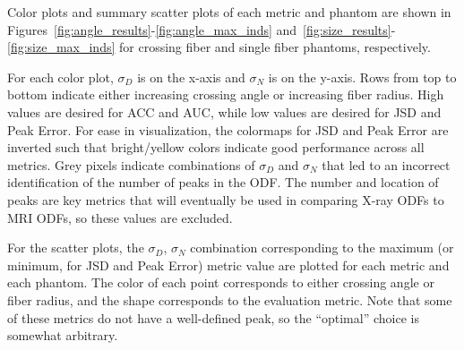 \documentclass[11pt]{article}
\begin{document}
Color plots and summary scatter plots of each metric and phantom are shown in
Figures~\ref{fig:angle_results}-\ref{fig:angle_max_inds}
and~\ref{fig:size_results}-\ref{fig:size_max_inds} for crossing fiber and single
fiber phantoms, respectively.

For each color plot, $\sigma_D$ is on the x-axis and $\sigma_N$ is on the
y-axis. Rows from top to bottom indicate either increasing crossing angle or
increasing fiber radius. High values are desired for ACC and AUC, while low
values are desired for JSD and Peak Error. For ease in visualization, the
colormaps for JSD and Peak Error are inverted such that bright/yellow colors
indicate good performance across all metrics. Grey pixels indicate combinations
of $\sigma_D$ and $\sigma_N$ that led to an incorrect identification of the
number of peaks in the ODF. The number and location of peaks are key metrics
that will eventually be used in comparing X-ray ODFs to MRI ODFs, so these
values are excluded.

For the scatter plots, the $\sigma_D$, $\sigma_N$ combination corresponding to the
maximum (or minimum, for JSD and Peak Error) metric value are plotted for each
metric and each phantom. The color of each point corresponds to either crossing
angle or fiber radius, and the shape corresponds to the evaluation metric. Note that
some of these metrics do not have a well-defined peak, so the ``optimal'' choice
is somewhat arbitrary. 
\end{document}
